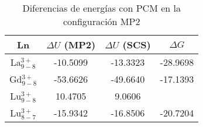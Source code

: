\begin{table}[h!]
\centering
\caption{\footnotesize Diferencias de energ\'ias con PCM en la 
configuraci\'on MP2}%
\begin{tabular}{c|ccc}\hline\hline
Ln & $\Delta U$ (MP2)  & $\Delta U$ (SCS) & $\Delta G$ \\ \hline
La$^{3+}_{9-8}$ & -10.5099 & -13.3323 & -28.9698 \\
Gd$^{3+}_{9-8}$ & -53.6626 & -49.6640 & -17.1393 \\ 
Lu$^{3+}_{9-8}$ &  10.4705 &   9.0606 &          \\ 
Lu$^{3+}_{8-7}$ & -15.9342 & -16.8506 & -20.7204 \\ 
\hline \end{tabular}\label{t3}\end{table}
